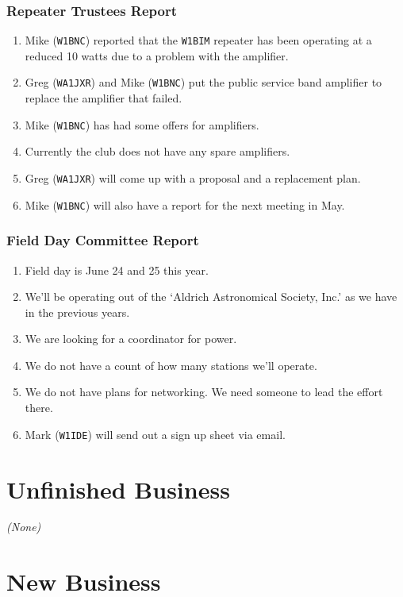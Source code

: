 \documentclass[10pt,letterpaper]{article}
\begin{document}
\subsubsection{Repeater Trustees Report}
\begin{enumerate}
  \item Mike (\texttt{W1BNC}) reported that the \texttt{W1BIM} repeater has been operating at a reduced 10 watts due to a problem with the amplifier.
  \item Greg (\texttt{WA1JXR}) and Mike (\texttt{W1BNC}) put the public service band amplifier to replace the amplifier that failed.
  \item Mike (\texttt{W1BNC}) has had some offers for amplifiers.
  \item Currently the club does not have any spare amplifiers.
  \item Greg (\texttt{WA1JXR}) will come up with a proposal and a replacement plan.
  \item Mike (\texttt{W1BNC}) will also have a report for the next meeting in May.
\end{enumerate}

\subsubsection{Field Day Committee Report}
\begin{enumerate}
  \item Field day is June 24 and 25 this year.
  \item We'll be operating out of the `Aldrich Astronomical Society, Inc.' as we have in the previous years.
  \item We are looking for a coordinator for power.
  \item We do not have a count of how many stations we'll operate.
  \item We do not have plans for networking. We need someone to lead the effort there.
  \item Mark (\texttt{W1IDE}) will send out a sign up sheet via email.
\end{enumerate}

\section{Unfinished Business}
\emph{(None)}

\section{New Business}
\end{document}
